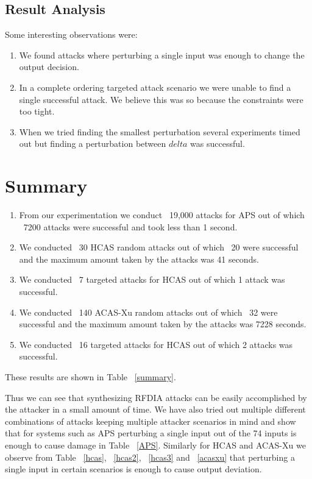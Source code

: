 \subsection{Result Analysis}
Some interesting observations were:
\begin{enumerate}
	\item We found attacks where perturbing a single input was enough to change the output decision.  
	\item In a complete ordering targeted attack scenario we were unable to find a single successful attack. We believe this was so because the constraints were too tight. 
	\item When we tried finding the smallest perturbation several experiments timed out but finding a perturbation between $delta$ was successful. 
\end{enumerate}	


\section{Summary}
\begin{enumerate}
	\item From our experimentation we conduct ~19,000 attacks for \ac{APS} out of which ~7200 attacks were successful and took less than 1 second. 
	\item We conducted ~30 \ac{HCAS} random attacks out of which ~20 were successful and the maximum amount taken by the attacks was 41 seconds.
	\item We conducted ~7 targeted attacks for \ac{HCAS} out of which 1 attack was successful.
	\item We conducted ~140 \ac{ACAS-Xu} random attacks out of which ~32 were successful and the maximum amount taken by the attacks was 7228 seconds.
	\item We conducted ~16 targeted attacks for \ac{HCAS} out of which 2 attacks was successful.
\end{enumerate}

 
These results are shown in Table ~\ref{summary}.

Thus we can see that synthesizing \ac{RFDIA} attacks can be easily accomplished by the attacker in a small amount of time. 
We have also tried out multiple different combinations of attacks keeping multiple attacker scenarios in mind and show that for systems such as \ac{APS} perturbing a single input out of the 74 inputs is enough to cause damage in Table ~\ref{APS}.
Similarly for \ac{HCAS} and \ac{ACAS-Xu} we observe  from Table ~\ref{hcas}, ~\ref{hcas2}, ~\ref{hcas3} and ~\ref{acasxu} that perturbing a single input in certain scenarios is enough to cause output deviation. 

